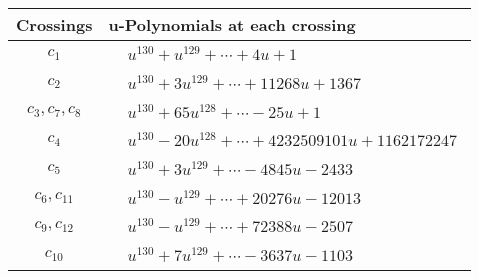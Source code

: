 \documentclass[1p]{elsarticle_modified}
\theoremstyle{definition}
\begin{document}
\begin{tabular}{m{50pt}|m{274pt}}
Crossings & \hspace{64pt}u-Polynomials at each crossing \\
\hline $$\begin{aligned}c_{1}\end{aligned}$$&$\begin{aligned}
&u^{130}+u^{129}+\cdots+4 u+1
\end{aligned}$\\
\hline $$\begin{aligned}c_{2}\end{aligned}$$&$\begin{aligned}
&u^{130}+3 u^{129}+\cdots+11268 u+1367
\end{aligned}$\\
\hline $$\begin{aligned}c_{3},c_{7},c_{8}\end{aligned}$$&$\begin{aligned}
&u^{130}+65 u^{128}+\cdots-25 u+1
\end{aligned}$\\
\hline $$\begin{aligned}c_{4}\end{aligned}$$&$\begin{aligned}
&u^{130}-20 u^{128}+\cdots+4232509101 u+1162172247
\end{aligned}$\\
\hline $$\begin{aligned}c_{5}\end{aligned}$$&$\begin{aligned}
&u^{130}+3 u^{129}+\cdots-4845 u-2433
\end{aligned}$\\
\hline $$\begin{aligned}c_{6},c_{11}\end{aligned}$$&$\begin{aligned}
&u^{130}- u^{129}+\cdots+20276 u-12013
\end{aligned}$\\
\hline $$\begin{aligned}c_{9},c_{12}\end{aligned}$$&$\begin{aligned}
&u^{130}- u^{129}+\cdots+72388 u-2507
\end{aligned}$\\
\hline $$\begin{aligned}c_{10}\end{aligned}$$&$\begin{aligned}
&u^{130}+7 u^{129}+\cdots-3637 u-1103
\end{aligned}$\\
\hline
\end{tabular}\\~\\
\end{document}
